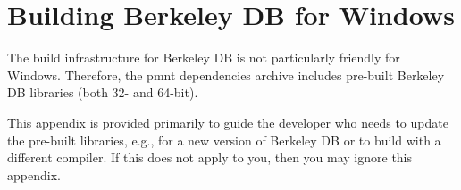 
\chapter{Building Berkeley DB for Windows}
\label{chapter-building-bdb-for-windows}

The build infrastructure for Berkeley DB is not particularly friendly for Windows.  Therefore, the \ac{pmnt} dependencies archive includes pre-built Berkeley DB libraries (both 32- and 64-bit).

This appendix is provided primarily to guide the developer who needs to update the pre-built libraries, e.g., for a new version of Berkeley DB or to build with a different compiler.  If this does not apply to you, then you may ignore this appendix.

